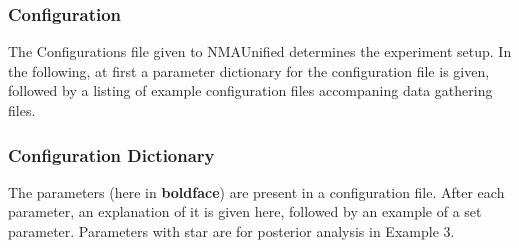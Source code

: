 \documentclass[11pt]{article}
\begin{document}
\subsubsection{Configuration}
The Configurations file given to NMAUnified determines the experiment setup. In the following, at first a parameter dictionary for the configuration file is given, followed by a listing of example configuration files accompaning data gathering files.

\subsubsection{Configuration Dictionary}
The parameters (here in \textbf{boldface}) are present in a configuration file. After each parameter, an explanation of it is given here, followed by an example of a set parameter. Parameters with star are for posterior analysis in Example 3.
\end{document}
